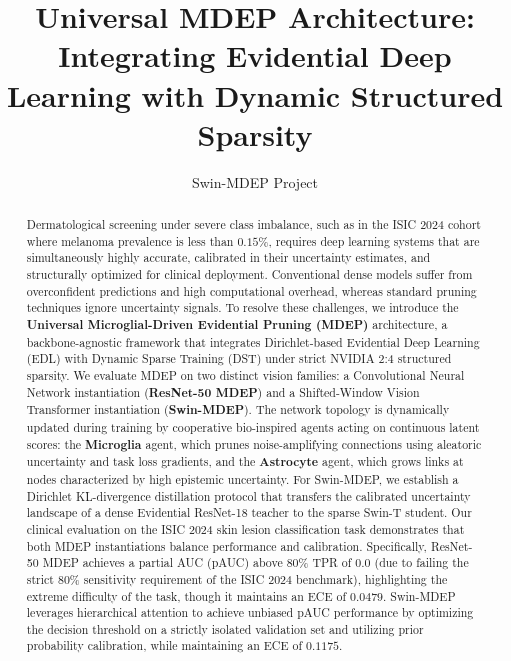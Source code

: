 \documentclass[letterpaper]{article} %
\title{Universal MDEP Architecture: Integrating Evidential Deep Learning with Dynamic Structured Sparsity}
\author{
    Swin-MDEP Project
}
\begin{document}
\maketitle

\begin{abstract}
Dermatological screening under severe class imbalance, such as in the ISIC 2024 cohort where melanoma prevalence is less than $0.15\%$, requires deep learning systems that are simultaneously highly accurate, calibrated in their uncertainty estimates, and structurally optimized for clinical deployment. Conventional dense models suffer from overconfident predictions and high computational overhead, whereas standard pruning techniques ignore uncertainty signals. To resolve these challenges, we introduce the \textbf{Universal Microglial-Driven Evidential Pruning (MDEP)} architecture, a backbone-agnostic framework that integrates Dirichlet-based Evidential Deep Learning (EDL) with Dynamic Sparse Training (DST) under strict NVIDIA 2:4 structured sparsity. We evaluate MDEP on two distinct vision families: a Convolutional Neural Network instantiation (\textbf{ResNet-50 MDEP}) and a Shifted-Window Vision Transformer instantiation (\textbf{Swin-MDEP}). The network topology is dynamically updated during training by cooperative bio-inspired agents acting on continuous latent scores: the \textbf{Microglia} agent, which prunes noise-amplifying connections using aleatoric uncertainty and task loss gradients, and the \textbf{Astrocyte} agent, which grows links at nodes characterized by high epistemic uncertainty. For Swin-MDEP, we establish a Dirichlet KL-divergence distillation protocol that transfers the calibrated uncertainty landscape of a dense Evidential ResNet-18 teacher to the sparse Swin-T student. Our clinical evaluation on the ISIC 2024 skin lesion classification task demonstrates that both MDEP instantiations balance performance and calibration. Specifically, ResNet-50 MDEP achieves a partial AUC (pAUC) above 80\% TPR of $0.0$ (due to failing the strict 80\% sensitivity requirement of the ISIC 2024 benchmark), highlighting the extreme difficulty of the task, though it maintains an ECE of $0.0479$. Swin-MDEP leverages hierarchical attention to achieve unbiased pAUC performance by optimizing the decision threshold on a strictly isolated validation set and utilizing prior probability calibration, while maintaining an ECE of $0.1175$.
\end{abstract}


\end{document}
